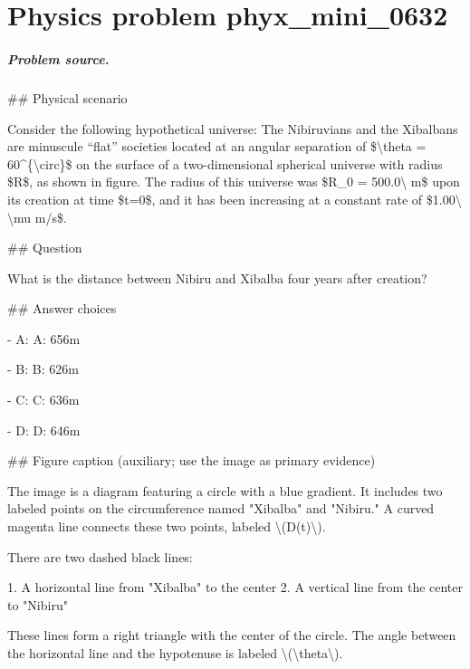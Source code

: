 
\chapter{Physics problem phyx\_mini\_0632}
\label{ch:PhyXMiniProblems_problem_phyx_mini_0632}

\paragraph{Problem source.}
\#\# Physical scenario

Consider the following hypothetical universe: The Nibiruvians and the Xibalbans are minuscule “flat” societies located at an angular separation of \$\textbackslash{}theta = 60\textasciicircum{}\{\textbackslash{}circ\}\$ on the surface of a two-dimensional spherical universe with radius \$R\$, as shown in figure. The radius of this universe was \$R\_0 = 500.0\textbackslash{} m\$ upon its creation at time \$t=0\$, and it has been increasing at a constant rate of \$1.00\textbackslash{} \textbackslash{}mu m/s\$.

\#\# Question

What is the distance between Nibiru and Xibalba four years after creation?

\#\# Answer choices

- A: A: 656m

- B: B: 626m

- C: C: 636m

- D: D: 646m

\#\# Figure caption (auxiliary; use the image as primary evidence)

The image is a diagram featuring a circle with a blue gradient. It includes two labeled points on the circumference named "Xibalba" and "Nibiru." A curved magenta line connects these two points, labeled \textbackslash{}(D(t)\textbackslash{}).

There are two dashed black lines:

1. A horizontal line from "Xibalba" to the center
2. A vertical line from the center to "Nibiru"

These lines form a right triangle with the center of the circle. The angle between the horizontal line and the hypotenuse is labeled \textbackslash{}(\textbackslash{}theta\textbackslash{}).

